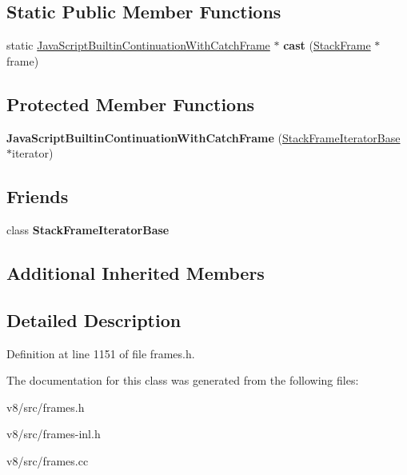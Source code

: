 \subsection*{Static Public Member Functions}
\begin{DoxyCompactItemize}
\item 
\mbox{\label{classv8_1_1internal_1_1JavaScriptBuiltinContinuationWithCatchFrame_a22d4f9cc8877c814b8e2d641ee7c717a}} 
static \mbox{\hyperlink{classv8_1_1internal_1_1JavaScriptBuiltinContinuationWithCatchFrame}{Java\+Script\+Builtin\+Continuation\+With\+Catch\+Frame}} $\ast$ {\bfseries cast} (\mbox{\hyperlink{classv8_1_1internal_1_1StackFrame}{Stack\+Frame}} $\ast$frame)
\end{DoxyCompactItemize}
\subsection*{Protected Member Functions}
\begin{DoxyCompactItemize}
\item 
\mbox{\label{classv8_1_1internal_1_1JavaScriptBuiltinContinuationWithCatchFrame_a1dbd98709ca1c70df72d2153152bb8f1}} 
{\bfseries Java\+Script\+Builtin\+Continuation\+With\+Catch\+Frame} (\mbox{\hyperlink{classv8_1_1internal_1_1StackFrameIteratorBase}{Stack\+Frame\+Iterator\+Base}} $\ast$iterator)
\end{DoxyCompactItemize}
\subsection*{Friends}
\begin{DoxyCompactItemize}
\item 
\mbox{\label{classv8_1_1internal_1_1JavaScriptBuiltinContinuationWithCatchFrame_ac7310421866976ca454bbe11c5f926c3}} 
class {\bfseries Stack\+Frame\+Iterator\+Base}
\end{DoxyCompactItemize}
\subsection*{Additional Inherited Members}


\subsection{Detailed Description}


Definition at line 1151 of file frames.\+h.



The documentation for this class was generated from the following files\+:\begin{DoxyCompactItemize}
\item 
v8/src/frames.\+h\item 
v8/src/frames-\/inl.\+h\item 
v8/src/frames.\+cc\end{DoxyCompactItemize}
